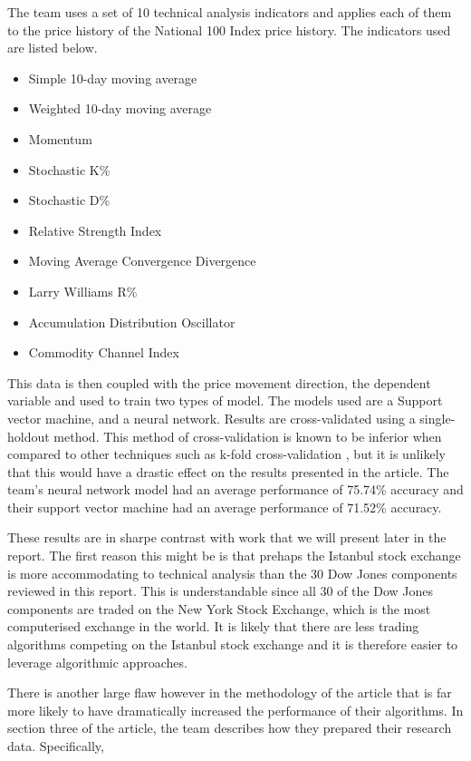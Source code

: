 \documentclass{report}
\begin{document}
The team uses a set of 10 technical analysis indicators and applies each of them to the price history of the National 100 Index price history. The indicators used are listed below.

\begin{itemize}[noitemsep]
  \item Simple 10-day moving average
  \item Weighted 10-day moving average
  \item Momentum
  \item Stochastic K\%
  \item Stochastic D\%
  \item Relative Strength Index
  \item Moving Average Convergence Divergence
  \item Larry Williams R\%
  \item Accumulation Distribution Oscillator
  \item Commodity Channel Index
\end{itemize}

This data is then coupled with the price movement direction, the dependent variable and used to train two types of model. The models used are a Support vector machine, and a neural network. Results are cross-validated using a single-holdout method. This method of cross-validation is known to be inferior when compared to other techniques such as k-fold cross-validation \cite{kohavi1995study}, but it is unlikely that this would have a drastic effect on the results presented in the article. The team's neural network model had an average performance of 75.74\% accuracy and their support vector machine had an average performance of 71.52\% accuracy.

These results are in sharpe contrast with work that we will present later in the report. The first reason this might be is that prehaps the Istanbul stock exchange is more accommodating to technical analysis than the 30 Dow Jones components reviewed in this report. This is understandable since all 30 of the Dow Jones components are traded on the New York Stock Exchange, which is the most computerised exchange in the world. It is likely that there are less trading algorithms competing on the Istanbul stock exchange and it is therefore easier to leverage algorithmic approaches. 

There is another large flaw however in the methodology of the article that is far more likely to have dramatically increased the performance of their algorithms. In section three of the article, the team describes how they prepared their research data. Specifically, 
\end{document}

